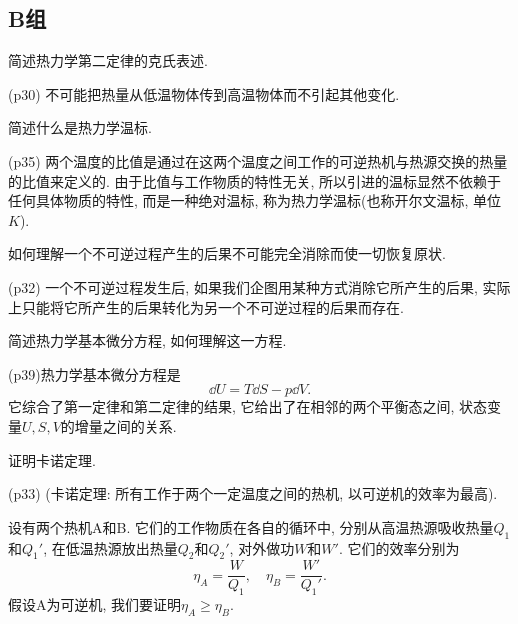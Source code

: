 \subsection{B组}
\begin{questions}
  \question 简述热力学第二定律的克氏表述.
  \begin{solution}
    (p30) 不可能把热量从低温物体传到高温物体而不引起其他变化.
  \end{solution}
  \question 简述什么是热力学温标.
  \begin{solution}
    (p35) 两个温度的比值是通过在这两个温度之间工作的可逆热机与热源交换的热量的比值来定义的. 由于比值与工作物质的特性无关, 所以引进的温标显然不依赖于任何具体物质的特性, 而是一种绝对温标, 称为热力学温标(也称开尔文温标, 单位$\unit{K}$).
  \end{solution}
  \question 如何理解一个不可逆过程产生的后果不可能完全消除而使一切恢复原状.
  \begin{solution}
    (p32) 一个不可逆过程发生后, 如果我们企图用某种方式消除它所产生的后果, 实际上只能将它所产生的后果转化为另一个不可逆过程的后果而存在.
  \end{solution}
  \question 简述热力学基本微分方程, 如何理解这一方程.
  \begin{solution}
    (p39)热力学基本微分方程是
    \begin{equation}
      \dd U = T\dd S - p\dd V.
    \end{equation}
    它综合了第一定律和第二定律的结果, 它给出了在相邻的两个平衡态之间, 状态变量$U, S, V$的增量之间的关系.
  \end{solution}
  \question 证明卡诺定理.
  \begin{solution}
    (p33) (卡诺定理: 所有工作于两个一定温度之间的热机, 以可逆机的效率为最高).

    设有两个热机A和B. 它们的工作物质在各自的循环中, 分别从高温热源吸收热量$Q_1$和$Q_1'$, 在低温热源放出热量$Q_2$和$Q_2'$, 对外做功$W$和$W'$. 它们的效率分别为
    \begin{equation}
      \eta_A = \frac{W}{Q_1}, \quad \eta_B = \frac{W'}{Q_1'}.
    \end{equation}
    假设A为可逆机, 我们要证明$\eta_A\ge\eta_B$.


\end{solution}
\end{questions}
